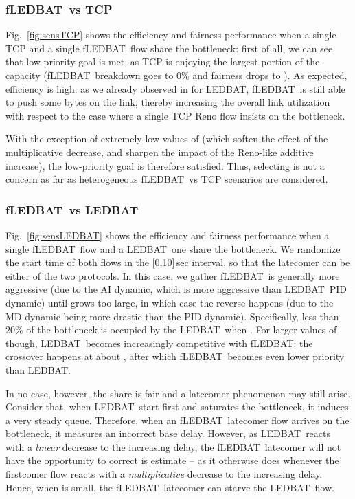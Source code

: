 \documentclass[conference]{IEEEtran}
\newcommand{\figR}[1]{Fig.~\ref{fig:#1}}
\newcommand{\btledbat}[0]{LEDBAT}
\newcommand{\fledbat}[0]{fLEDBAT}
\begin{document}
\subsubsection{\fledbat\ vs TCP}


\figR{sensTCP} shows the efficiency and fairness performance when a single
TCP and a single \fledbat\ flow share the bottleneck: first of all, we can see that low-priority goal is met, as TCP is enjoying the largest portion of the capacity (\fledbat\ breakdown goes to 0\% and fairness drops to ).
As expected, efficiency is high: as we already observed in \cite{icccn10} for \btledbat, \fledbat\ is still able to push some bytes on the link, thereby increasing the overall link utilization with respect to the case where a single TCP Reno flow insists on the bottleneck.

With the exception of extremely low values of   (which soften the effect of the multiplicative decrease, and sharpen the impact of the Reno-like additive increase), the low-priority goal is therefore satisfied. Thus, selecting  is not a concern as far as heterogeneous \fledbat\ vs TCP scenarios are considered.



\subsubsection{\fledbat\ vs \btledbat}

\figR{sensLEDBAT} shows the efficiency and fairness performance when a single \fledbat\ flow and a \btledbat\ one share the bottleneck. We randomize the start time of both flows in the [0,10]\,sec interval, so that the latecomer can be either of the two protocols.
In this case, we gather \fledbat\ is generally more aggressive (due to the AI dynamic, which is more aggressive than \btledbat\ PID dynamic) until  grows too large, in which case the reverse happens (due to the MD dynamic being more drastic than the PID dynamic).
Specifically, less than 20\% of the bottleneck is occupied by the \btledbat\ when  . For larger values of  though, \btledbat\ becomes increasingly competitive with  \fledbat: the crossover happens at about , after which \fledbat\ becomes even lower priority than \btledbat.

In no case, however, the share is fair and a latecomer phenomenon may still arise. Consider that, when \btledbat\ start first and saturates the bottleneck, it induces a very steady queue. Therefore, when an \fledbat\  latecomer flow arrives on the bottleneck, it measures an incorrect base delay. However, as \btledbat\ reacts with a \emph{linear} decrease to the increasing delay, the \fledbat\ latecomer will not have the opportunity to correct is estimate -- as it otherwise does whenever the firstcomer flow reacts with a \emph{multiplicative} decrease to the increasing delay. Hence, when  is small, the \fledbat\  latecomer can starve the \btledbat\ flow.
\end{document}
